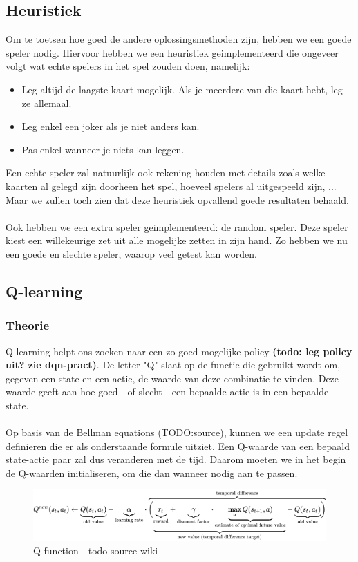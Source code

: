 \documentclass[11pt]{article}
\begin{document}
\subsection{Heuristiek}

Om te toetsen hoe goed de andere oplossingsmethoden zijn, hebben we een goede speler nodig. Hiervoor hebben we een heuristiek geimplementeerd die ongeveer volgt wat echte spelers in het spel zouden doen, namelijk:
\begin{itemize}
	\item Leg altijd de laagste kaart mogelijk. Als je meerdere van die kaart hebt, leg ze allemaal.
	\item Leg enkel een joker als je niet anders kan.
	\item Pas enkel wanneer je niets kan leggen.
\end{itemize}
Een echte speler zal natuurlijk ook rekening houden met details zoals welke kaarten al gelegd zijn doorheen het spel, hoeveel spelers al uitgespeeld zijn, ... Maar we zullen toch zien dat deze heuristiek opvallend goede resultaten behaald. \\\\
Ook hebben we een extra speler geimplementeerd: de random speler. Deze speler kiest een willekeurige zet uit alle mogelijke zetten in zijn hand. Zo hebben we nu een goede en slechte speler, waarop veel getest kan worden.


\subsection{Q-learning}
\subsubsection{Theorie}
Q-learning helpt ons zoeken naar een zo goed mogelijke policy \textbf{(todo: leg policy uit? zie dqn-pract)}. De letter "Q" slaat op de functie die gebruikt wordt om, gegeven een state en een actie, de waarde van deze combinatie te vinden. Deze waarde geeft aan hoe goed - of slecht - een bepaalde actie is in een bepaalde state.\\\\
Op basis van de Bellman equations (TODO:source), kunnen we een update regel definieren die er als onderstaande formule uitziet. Een Q-waarde van een bepaald state-actie paar zal dus veranderen met de tijd. Daarom moeten we in het begin de Q-waarden initialiseren, om die dan wanneer nodig aan te passen.

\begin{figure}[h]
\centering
\includegraphics[scale=0.70]{images/qformula.png}
\caption{Q function - todo source wiki}
\end{figure}
\end{document}
